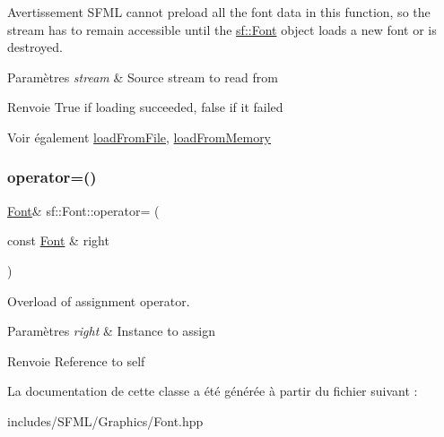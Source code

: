 \begin{DoxyWarning}{Avertissement}
S\+F\+ML cannot preload all the font data in this function, so the stream has to remain accessible until the \hyperlink{classsf_1_1Font}{sf\+::\+Font} object loads a new font or is destroyed.
\end{DoxyWarning}

\begin{DoxyParams}{Paramètres}
{\em stream} & Source stream to read from\\
\hline
\end{DoxyParams}
\begin{DoxyReturn}{Renvoie}
True if loading succeeded, false if it failed
\end{DoxyReturn}
\begin{DoxySeeAlso}{Voir également}
\hyperlink{classsf_1_1Font_ab020052ef4e01f6c749a85571c0f3fd1}{load\+From\+File}, \hyperlink{classsf_1_1Font_abf2f8d6de31eb4e1db02e061c323e346}{load\+From\+Memory} 
\end{DoxySeeAlso}
\mbox{\label{classsf_1_1Font_a232515549846e3172a514d0b47918399}} 
\subsubsection{\texorpdfstring{operator=()}{operator=()}}
{\footnotesize\ttfamily \hyperlink{classsf_1_1Font}{Font}\& sf\+::\+Font\+::operator= (\begin{DoxyParamCaption}\item[{const \hyperlink{classsf_1_1Font}{Font} \&}]{right }\end{DoxyParamCaption})}



Overload of assignment operator. 


\begin{DoxyParams}{Paramètres}
{\em right} & Instance to assign\\
\hline
\end{DoxyParams}
\begin{DoxyReturn}{Renvoie}
Reference to self 
\end{DoxyReturn}


La documentation de cette classe a été générée à partir du fichier suivant \+:\begin{DoxyCompactItemize}
\item 
includes/\+S\+F\+M\+L/\+Graphics/Font.\+hpp\end{DoxyCompactItemize}
